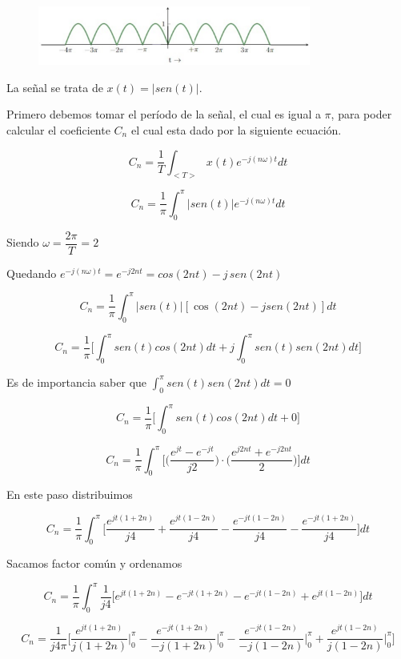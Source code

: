 \begin{figure}[H]
  \centering
  \includegraphics[width=0.8\textwidth]{photos/onda_completa.png}
\end{figure}

La se\~nal se trata de $x(t) = |sen(t)|$.

Primero debemos tomar el per\'iodo de la se\~nal, el cual es igual a $\pi$, para poder calcular el coeficiente $C_n$ el cual esta dado por la siguiente ecuaci\'on.

$$C_n = \dfrac{1}{T} \int_{<T>} x(t) e^{-j(n\omega)t} dt$$

$$C_n = \dfrac{1}{\pi} \int_{0}^{\pi} |sen(t)| e^{-j(n\omega)t} dt$$

Siendo $\omega = \dfrac{2\pi}{T} = 2$

Quedando $e^{-j(n\omega)t} = e^{-j2nt} = cos(2nt)-j\,sen(2nt)$

$$C_n = \dfrac{1}{\pi} \int_{0}^{\pi} |sen(t)| [\cos(2nt) - j sen(2nt)] dt$$

$$C_n = \dfrac{1}{\pi} \bigg[\int_{0}^{\pi} sen(t) cos(2nt) dt + j \int_{0}^{\pi} sen(t) sen(2nt) dt \bigg] $$

Es de importancia saber que $ \int_{0}^{\pi} sen(t) sen(2nt) dt = 0$

$$C_n = \dfrac{1}{\pi} \bigg[\int_{0}^{\pi} sen(t) cos(2nt) dt + 0 \bigg] $$

$$C_n = \dfrac{1}{\pi} \int_{0}^{\pi} \bigg[ \bigg(\dfrac{e^{jt}-e^{-jt}}{j2}\bigg) \cdot \bigg(\dfrac{e^{j2nt}+e^{-j2nt}}{2} \bigg) \bigg] dt $$

En este paso distribuimos

$$C_n = \dfrac{1}{\pi} \int_{0}^{\pi} \bigg[\dfrac{e^{jt(1+2n)}}{j4} + \dfrac{e^{jt(1-2n)}}{j4} - \dfrac{e^{-jt(1-2n)}}{j4} - \dfrac{e^{-jt(1+2n)}}{j4}\bigg] dt $$

Sacamos factor com\'un y ordenamos

$$C_n = \dfrac{1}{\pi} \int_{0}^{\pi} \dfrac{1}{j4} \bigg[e^{jt(1+2n)} - e^{-jt(1+2n)} - e^{-jt(1-2n)} + e^{jt(1-2n)}\bigg] dt $$

$$C_n = \dfrac{1}{j4\pi} \bigg[\dfrac{e^{jt(1+2n)}}{j(1+2n)} \bigg\rvert_{0}^{\pi} - \dfrac{e^{-jt(1+2n)}}{-j(1+2n)} \bigg\rvert_{0}^{\pi} - \dfrac{e^{-jt(1-2n)}}{-j(1-2n)} \bigg\rvert_{0}^{\pi} + \dfrac{e^{jt(1-2n)}}{j(1-2n)} \bigg\rvert_{0}^{\pi} \bigg] $$

